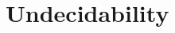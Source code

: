 \documentclass[open-logic-chapter]{subfiles}
\begin{document}
\chapter{Undecidability}







\OLEndChapterHook
\end{document}
